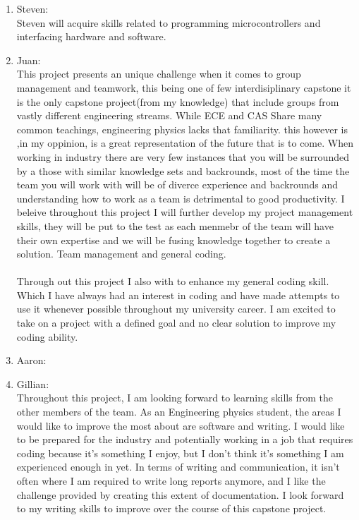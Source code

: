 \documentclass[12pt]{article}
\begin{document}
\begin{enumerate}
  \begin{enumerate}
    \item{Steven:}\\
    Steven will acquire skills related to programming microcontrollers and interfacing
    hardware and software. \\
    \item{Juan:}\\
    This project presents an unique challenge when it comes to group management and teamwork, this being one of few interdisiplinary capstone it is the only 
    capstone project(from my knowledge) that include groups from vastly different  engineering streams. While ECE and CAS Share many common teachings, engineering physics lacks that familiarity.
    this however is ,in my oppinion, is a great representation of the future that is to come. When working in industry there are very few instances that you will be surrounded by a those with similar knowledge sets 
    and backrounds, most of the time the team you will work with will be of diverce experience and backrounds and understanding how to work as a team is detrimental to good productivity. I beleive throughout this 
    project I will further develop my project management skills, they will be put to the test as each menmebr of the team will have their own expertise and we will be fusing knowledge together to create a solution.
    Team management and general coding.\\
    \\
    Through out this project I also with to enhance my general coding skill. Which I have always had an interest in coding and have made attempts to use it whenever possible throughout my university career. I am excited to 
    take on a project with a defined goal and no clear solution to improve my coding ability.
    \item{Aaron:}\\
    \item {Gillian:}\\
    Throughout this project, I am looking forward to learning skills from the other members of the team. As an Engineering physics student, the areas I would like to improve the most about are software and writing. I would like to be prepared for the industry and potentially working in a job that requires coding because it’s something I enjoy, but I don’t think it’s something I am experienced enough in yet. 
    \noindent In terms of writing and communication, it isn’t often where I am required to write long reports anymore, and I like the challenge provided by creating this extent of documentation. I look forward to my writing skills to improve over the course of this capstone project. 


\end{enumerate}
\end{enumerate}
\end{document}
